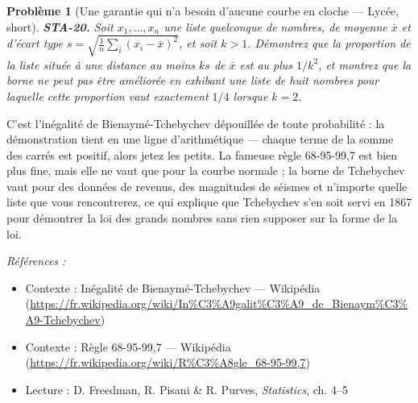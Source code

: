 \documentclass[11pt]{article}
\newtheorem{problem}{Problème}
\newenvironment{refs}{\par\small\noindent\emph{Références :}\begin{itemize}\setlength\itemsep{0pt}}{\end{itemize}\normalsize}
\begin{document}
\bigskip

\begin{problem}[{Une garantie qui n'a besoin d'aucune courbe en cloche --- Lycée, short}]
\textbf{STA-20.} Soit $ x_1, \dots, x_n $ une liste quelconque de nombres,
de moyenne $ \bar{x} $ et d'écart type
$ s = \sqrt{\frac{1}{n}\sum_i (x_i - \bar{x})^2} $, et soit $ k >1 $. Démontrez que la
proportion de la liste située à une distance au moins $ ks $ de $ \bar{x} $ est au plus
$ 1/k^2 $, et montrez que la borne ne peut pas être améliorée en exhibant une liste de huit
nombres pour laquelle cette proportion vaut exactement $ 1/4 $ lorsque $ k = 2 $.
\end{problem}

\noindent C'est l'inégalité de Bienaymé-Tchebychev dépouillée de toute probabilité : la
démonstration tient en une ligne d'arithmétique --- chaque terme de la somme des carrés est positif,
alors jetez les petits. La fameuse règle \og{} 68-95-99,7 \fg{} est bien plus fine, mais elle ne vaut que
pour la courbe normale ; la borne de Tchebychev vaut pour des données de revenus, des magnitudes de
séismes et n'importe quelle liste que vous rencontrerez, ce qui explique que Tchebychev s'en soit
servi en 1867 pour démontrer la loi des grands nombres sans rien supposer sur la forme de la
loi.

\begin{refs}
\item Contexte : Inégalité de Bienaymé-Tchebychev --- Wikipédia (\url{https://fr.wikipedia.org/wiki/In%C3%A9galit%C3%A9_de_Bienaym%C3%A9-Tchebychev})
\item Contexte : Règle 68-95-99,7 --- Wikipédia (\url{https://fr.wikipedia.org/wiki/R%C3%A8gle_68-95-99,7})
\item Lecture : D. Freedman, R. Pisani \& R. Purves, \textit{Statistics}, ch. 4--5
\end{refs}

\bigskip
\end{document}
